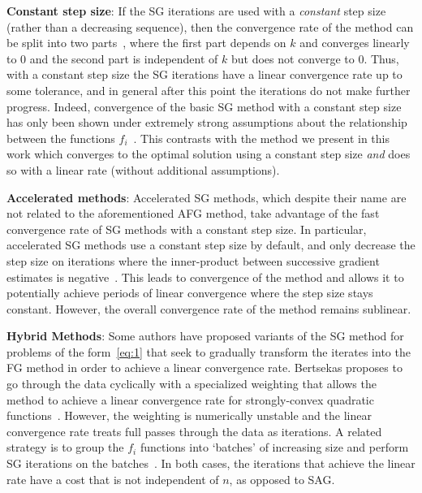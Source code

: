 \documentclass{article}
\begin{document}
\textbf{Constant step size}: If the SG iterations are used with a \emph{constant} step size (rather than a decreasing sequence), then the convergence rate of the method can be split into two parts~\cite[Proposition 2.4]{nedic2001convergence}, where the first part depends on $k$ and converges linearly to $0$ and the second part is independent of $k$ but does not converge to $0$.  Thus, with a constant step size the SG iterations have a linear convergence rate up to some tolerance, and in general after this point the iterations do not make further progress.  Indeed, convergence of the basic SG method with a constant step size has only been shown under extremely strong assumptions about the relationship between the functions $f_i$~\cite{solodov1998incremental}. This contrasts with the method we present in this work which converges to the optimal solution using a constant step size \emph{and} does so with a linear rate (without additional assumptions).

\textbf{Accelerated methods}: Accelerated SG methods, which despite their name are not related to the aforementioned AFG method, take advantage of the fast convergence rate of SG methods with a constant step size.  In particular, accelerated SG methods use a constant step size by default, and only decrease the step size on iterations where the inner-product between successive gradient estimates is negative~\cite{kesten1958accelerated,delyon1993accelerated}.  This leads to convergence of the method and allows it to potentially achieve periods of linear convergence where the step size stays constant.  However, the overall convergence rate of the method remains sublinear.

\textbf{Hybrid Methods}: Some authors have proposed variants of the SG
method for problems of the form~\eqref{eq:1} that seek to gradually
transform the iterates into the FG method in order to achieve a linear
convergence rate.  Bertsekas proposes to go through the data
cyclically with a specialized weighting that allows the method to achieve a
linear convergence rate for strongly-convex quadratic functions~\cite{bertsekas1997new}.  However,
the weighting is numerically unstable and the linear convergence rate
treats full passes through the data as iterations. A related strategy is to 
 group the $f_i$ functions into `batches' of increasing size and perform SG iterations on the batches~\cite{friedlander2011hybrid}.  In both
cases, the iterations that achieve the linear rate have a cost that is not
independent of $n$, as opposed to SAG.
\end{document}

